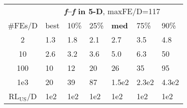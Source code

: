 \begin{tabular}{c|llllll}
 & \multicolumn{6}{|c}{\textbf{\textit{f}\raisebox{-0.35ex}{1}--\textit{f}\raisebox{-0.35ex}{24} in 5-D}, maxFE/D=117}\\
\#FEs/D & best & 10\% & 25\% & \textbf{med} & 75\% & 90\%\\
2 & \hspace*{1ex}1.3 & \hspace*{1ex}1.8 & \hspace*{1ex}2.1 & \hspace*{1ex}2.7 & \hspace*{1ex}3.5 & \hspace*{1ex}4.8\\
10 & \hspace*{1ex}2.6 & \hspace*{1ex}3.2 & \hspace*{1ex}3.6 & \hspace*{1ex}5.0 & \hspace*{1ex}6.3 & 50\\
100 & 10 & 12 & 20 & 26 & 35 & 95\\
1e3 & 20 & 39 & 87 & 1.5e2 & 2.3e2 & 4.3e2\\
$\text{RL}_{\text{US}}$/D & 1e2 & 1e2 & 1e2 & 1e2 & 1e2 & 1e2
\end{tabular}
